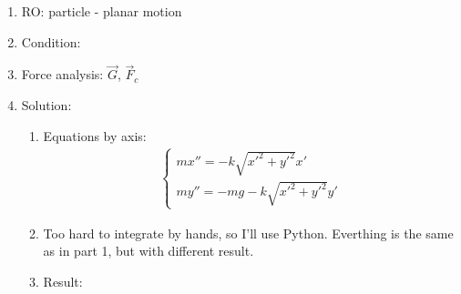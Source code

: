 \begin{enumerate}
    \item RO: particle - planar motion
    \item Condition:
          \begin{center}
          \end{center}
    \item Force analysis:
          $\vec{G}$, $\vec{F}_{c}$
    \item Solution:
          \begin{enumerate}
              \item Equations by axis:
                    \begin{align}
                        \begin{cases}
                            mx'' = -k \sqrt{x'^2 + y'^2} x' \\
                            my'' = -mg - k \sqrt{x'^2 + y'^2} y'
                        \end{cases}
                    \end{align}
              \item Too hard to integrate by hands, so I'll use Python.
                    Everthing is the same as in part 1, but with different result.
              \item Result: \\

\end{enumerate}
\end{enumerate}
